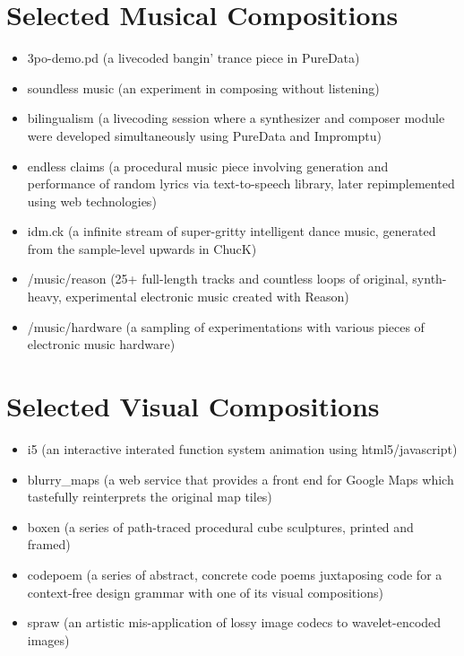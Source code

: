 \documentclass[12pt]{article}
\begin{document}
\section*{Selected Musical Compositions}
\begin{itemize}
  \item 3po-demo.pd (a livecoded bangin' trance piece in PureData)
  \item soundless music (an experiment in composing without listening)
  \item bilingualism (a livecoding session where a synthesizer and composer module were developed simultaneously using PureData and Impromptu)
  \item endless claims (a procedural music piece involving generation and performance of random lyrics via text-to-speech library, later repimplemented using web technologies)
  \item idm.ck (a infinite stream of super-gritty intelligent dance music, generated from the sample-level upwards in ChucK) 
  \item /music/reason (25+ full-length tracks and countless loops of original, synth-heavy, experimental electronic music created with Reason) 
  \item /music/hardware (a sampling of experimentations with various pieces of electronic music hardware)
\end{itemize}

\section*{Selected Visual Compositions}
\begin{itemize}
  \item i5 (an interactive interated function system animation using html5/javascript)
  \item blurry\_maps (a web service that provides a front end for Google Maps which tastefully reinterprets the original map tiles)
  \item boxen (a series of path-traced procedural cube sculptures, printed and framed)
  \item codepoem (a series of abstract, concrete code poems juxtaposing code for a context-free design grammar with one of its visual compositions)
  \item spraw (an artistic mis-application of lossy image codecs to wavelet-encoded images)
\end{itemize}

\newpage
\end{document}
